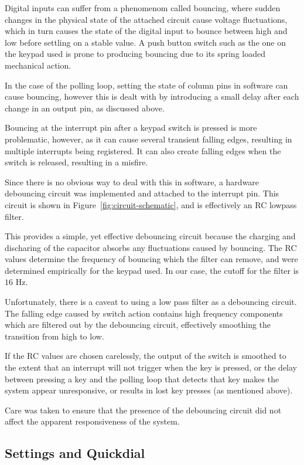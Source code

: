 \documentclass[11pt,a4paper,twocolumn]{scrartcl}
\begin{document}
Digital inputs can suffer from a phenomenom called bouncing, where sudden changes in the physical state of the attached circuit cause voltage fluctuations, which in turn causes the state of the digital input to bounce between high and low before settling on a stable value. A push button switch such as the one on the keypad used is prone to producing bouncing due to its spring loaded mechanical action.

In the case of the polling loop, setting the state of column pins in software can cause bouncing, however this is dealt with by introducing a small delay after each change in an output pin, as discussed above.

Bouncing at the interrupt pin after a keypad switch is pressed is more problematic, however, as it can cause several transient falling edges, resulting in multiple interrupts being registered. It can also create falling edges when the switch is released, resulting in a misfire. 

Since there is no obvious way to deal with this in software, a hardware debouncing circuit was implemented and attached to the interrupt pin. This circuit is shown in Figure~\ref{fig:circuit-schematic}, and is effectively an RC lowpass filter.

This provides a simple, yet effective debouncing circuit because the charging and discharing of the capacitor absorbs any fluctuations caused by bouncing\cite{Li_2021}. The RC values determine the frequency of bouncing which the filter can remove, and were determined empirically for the keypad used. In our case, the cutoff for the filter is $16$ Hz.

Unfortunately, there is a caveat to using a low pass filter as a debouncing circuit. The falling edge caused by switch action contains high frequency components which are filtered out by the debouncing circuit, effectively smoothing the transition from high to low. 

If the RC values are chosen carelessly, the output of the switch is smoothed to the extent that an interrupt will not trigger when the key is pressed, or the delay between pressing a key and the polling loop that detects that key makes the system appear unresponsive, or results in lost key presses (as mentioned above). 

Care was taken to ensure that the presence of the debouncing circuit did not affect the apparent responsiveness of the system.

\subsection{Settings and Quickdial} \label{settings-quickdial}
\end{document}
